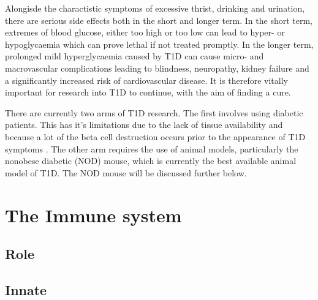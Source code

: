 Alongisde the charactistic symptoms of excessive thrist, drinking and urination, there are serious side effects both in the short and longer term.
In the short term, extremes of blood glucose, either too high or too low can lead to hyper- or hypoglycaemia which can prove lethal if not treated promptly.
In the longer term, prolonged mild hyperglycaemia caused by T1D can cause micro- and macrovascular complications leading to blindness, neuropathy, kidney failure and a significantly increased risk of cardiovascular disease\citep{OxClinMed}.
It is therefore vitally important for research into T1D to continue, with the aim of finding a cure.

There are currently two arms of T1D research.
The first involves using diabetic patients.
This has it's limitations due to the lack of tissue availability and because a lot of the beta cell destruction occurs prior to the appearance of T1D symptoms \citep{Thomas2000}.
The other arm requires the use of animal models, particularly the nonobese diabetic (NOD) mouse, which is currently the best available animal model of T1D.
The NOD mouse will be discussed further below.

\section{The Immune system}
\subsection{Role}


\subsection{Innate}

